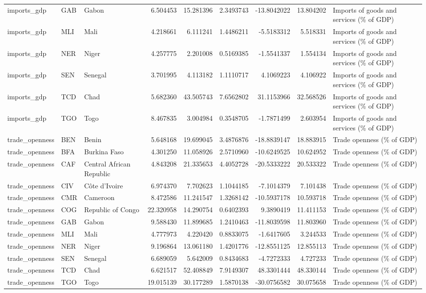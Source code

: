 \begin{table}
\begin{tabular}[t]{lllrrrrrl}
imports\_gdp & GAB & Gabon & 6.504453 & 15.281396 & 2.3493743 & -13.8042022 & 13.804202 & Imports of goods and services (\% of GDP)\\
\addlinespace
imports\_gdp & MLI & Mali & 4.218661 & 6.111241 & 1.4486211 & -5.5183312 & 5.518331 & Imports of goods and services (\% of GDP)\\
imports\_gdp & NER & Niger & 4.257775 & 2.201008 & 0.5169385 & -1.5541337 & 1.554134 & Imports of goods and services (\% of GDP)\\
imports\_gdp & SEN & Senegal & 3.701995 & 4.113182 & 1.1110717 & 4.1069223 & 4.106922 & Imports of goods and services (\% of GDP)\\
imports\_gdp & TCD & Chad & 5.682360 & 43.505743 & 7.6562802 & 31.1153966 & 32.568526 & Imports of goods and services (\% of GDP)\\
imports\_gdp & TGO & Togo & 8.467835 & 3.004984 & 0.3548705 & -1.7871499 & 2.603954 & Imports of goods and services (\% of GDP)\\
\addlinespace
trade\_openness & BEN & Benin & 5.648168 & 19.699045 & 3.4876876 & -18.8839147 & 18.883915 & Trade openness (\% of GDP)\\
trade\_openness & BFA & Burkina Faso & 4.301250 & 11.058926 & 2.5710960 & -10.6249525 & 10.624952 & Trade openness (\% of GDP)\\
trade\_openness & CAF & Central African Republic & 4.843208 & 21.335653 & 4.4052728 & -20.5333222 & 20.533322 & Trade openness (\% of GDP)\\
trade\_openness & CIV & Côte d'Ivoire & 6.974370 & 7.702623 & 1.1044185 & -7.1014379 & 7.101438 & Trade openness (\% of GDP)\\
trade\_openness & CMR & Cameroon & 8.472586 & 11.241547 & 1.3268142 & -10.5937178 & 10.593718 & Trade openness (\% of GDP)\\
\addlinespace
trade\_openness & COG & Republic of Congo & 22.320958 & 14.290754 & 0.6402393 & 9.3890419 & 11.411153 & Trade openness (\% of GDP)\\
trade\_openness & GAB & Gabon & 9.588430 & 11.899685 & 1.2410463 & -11.8039598 & 11.803960 & Trade openness (\% of GDP)\\
trade\_openness & MLI & Mali & 4.777973 & 4.220420 & 0.8833075 & -1.6417605 & 3.244533 & Trade openness (\% of GDP)\\
trade\_openness & NER & Niger & 9.196864 & 13.061180 & 1.4201776 & -12.8551125 & 12.855113 & Trade openness (\% of GDP)\\
trade\_openness & SEN & Senegal & 6.689059 & 5.642009 & 0.8434683 & -4.7272333 & 4.727233 & Trade openness (\% of GDP)\\
\addlinespace
trade\_openness & TCD & Chad & 6.621517 & 52.408849 & 7.9149307 & 48.3301444 & 48.330144 & Trade openness (\% of GDP)\\
trade\_openness & TGO & Togo & 19.015139 & 30.177289 & 1.5870138 & -30.0756582 & 30.075658 & Trade openness (\% of GDP)\\
\bottomrule
\end{tabular}
\end{table}
